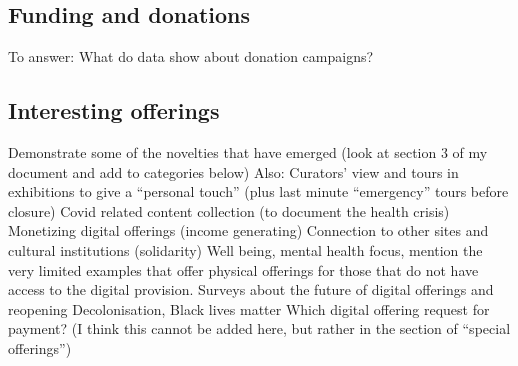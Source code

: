 \documentclass{egpubl}
\begin{document}
\subsection{Funding and donations}
\color{red}To answer: What do data show about donation campaigns?\color{black}



\subsection{Interesting offerings }
Demonstrate some of the novelties that have emerged (look at section 3 of my document and add to categories below)
Also: 
Curators’ view and tours in exhibitions to give a “personal touch” (plus last minute “emergency” tours before closure)
Covid related content collection (to document the health crisis)
Monetizing digital offerings (income generating)
Connection to other sites and cultural institutions (solidarity)
Well being, mental health focus, mention the very limited examples that offer physical offerings for those  that do not have access to the digital provision.
Surveys about the future of digital offerings and reopening
Decolonisation, Black lives matter
Which digital offering request for payment? (I think this cannot be added here, but rather in the section of “special offerings”)
\end{document}

